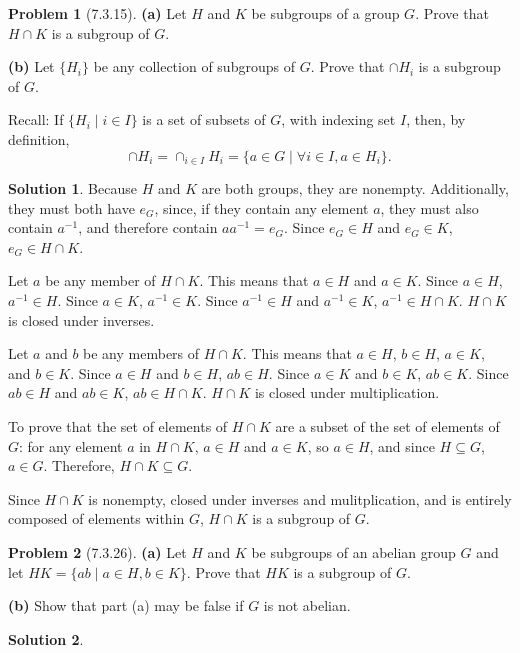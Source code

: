 \documentclass[12pt]{article}
\theoremstyle{definition}
\newtheorem*{prob}{Problem}
\newtheorem*{soln}{Solution}
\begin{document}
\begin{prob}[7.3.15] \text{ }
\textbf{(a)}   Let $H$ and $K$ be subgroups of a group $G$. 
Prove that $H \cap K$ is a subgroup of  $G$.  

\textbf{(b)}   Let $\{H_i\}$ be any collection of  subgroups of  $G$. 
Prove that $\cap H_i$ is a subgroup of  $G$.

Recall: If $\{ H_i \mid i \in I \}$ is a set of subsets of $G$, with indexing set $I$,
then, by definition, 
\[
\cap H_i = \cap_{i \in I} H_i = \{ a \in G \mid \forall i \in I, a \in H_i \}.
\]
\end{prob}

\begin{soln}\quad

Because $H$ and $K$ are both groups, they are nonempty.
Additionally, they must both have $e_G$, since,
if they contain any element $a$, they must also contain $a^{-1}$,
and therefore contain $aa^{-1}=e_G$.
Since $e_G\in H$ and $e_G\in K$, $e_G\in H\cap K$.

Let $a$ be any member of $H\cap K$.
This means that $a\in H$ and $a\in K$.
Since $a\in H$, $a^{-1}\in H$.
Since $a\in K$, $a^{-1}\in K$.
Since $a^{-1}\in H$ and $a^{-1}\in K$, $a^{-1}\in H\cap K$.
$H\cap K$ is closed under inverses.

Let $a$ and $b$ be any members of $H\cap K$.
This means that $a\in H$, $b\in H$, $a\in K$, and $b\in K$.
Since $a\in H$ and $b\in H$, $ab\in H$.
Since $a\in K$ and $b\in K$, $ab\in K$.
Since $ab\in H$ and $ab\in K$, $ab\in H\cap K$.
$H\cap K$ is closed under multiplication.

To prove that the set of elements of $H\cap K$
are a subset of the set of elements of $G$:
for any element $a$ in $H\cap K$, $a\in H$ and $a\in K$,
so $a\in H$, and since $H\subseteq G$, $a\in G$.
Therefore, $H\cap K\subseteq G$.

Since $H\cap K$ is nonempty,
closed under inverses and mulitplication,
and is entirely composed of elements within $G$,
$H\cap K$ is a subgroup of $G$.

\end{soln}

\begin{prob}[7.3.26] \text{ }
\textbf{(a)}   Let $H$ and $K$ be subgroups of  an abelian group $G$ and let 
$HK = \{ab \mid a\in H, b\in K\}$. Prove that $HK$ is a subgroup of  $G$.

\textbf{(b)} Show that part (a) may be false if  $G$ is not abelian.
\end{prob}

\begin{soln}

\end{soln}
\end{document}
